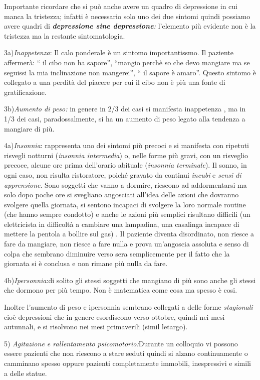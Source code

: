 \documentclass[]{article}
\begin{document}
Importante ricordare che si può anche avere un quadro di depressione in
cui manca la tristezza; infatti è necessario solo uno dei due sintomi
quindi possiamo avere quadri di \emph{\textbf{depressione sine
depressione}:} l'elemento più evidente non è la tristezza ma la restante
sintomatologia.

3a)\emph{Inappetenza}: Il calo ponderale è un sintomo importantissmo. Il
paziente affermerà: `` il cibo non ha sapore'', ``mangio perchè so che
devo mangiare ma se seguissi la mia inclinazione non mangerei'', `` il
sapore è amaro''. Questo sintomo è collegato a una perdità del piacere
per cui il cibo non è più una fonte di gratificazione.

3b)\emph{Aumento di peso:} in genere in 2/3 dei casi si manifesta
inappetenza , ma in 1/3 dei casi, paradossalmente, si ha un aumento di
peso legato alla tendenza a mangiare di più.

4a)\emph{Insonnia}: rappresenta uno dei sintomi più precoci e si
manifesta con ripetuti risvegli notturni (\emph{insonnia intermedia}) o,
nelle forme più gravi, con un risveglio precoce, alcune ore prima
dell'orario abituale (\emph{insonnia terminale}). Il sonno, in ogni
caso, non risulta ristoratore, poiché gravato da continui \emph{incubi}
e \emph{sensi di apprensione}. Sono soggetti che vanno a dormire,
riescono ad addormentarsi ma solo dopo poche ore si svegliano angosciati
all'idea delle azioni che dovranno svolgere quella giornata, si sentono
incapaci di svolgere la loro normale routine (che hanno sempre condotto)
e anche le azioni più semplici risultano difficili (un elettricista in
difficoltà a cambiare una lampadina, una casalinga incapace di mettere
la pentola a bollire sul gas) . Il paziente diventa disordinato, non
riesce a fare da mangiare, non riesce a fare nulla e prova un'angoscia
assoluta e senso di colpa che sembrano diminuire verso sera
semplicemente per il fatto che la giornata si è conclusa e non rimane
più nulla da fare.

4b)\emph{Ipersonnia}:di solito gli stessi soggetti che mangiano di più
sono anche gli stessi che dormono per più tempo. Non è matematica come
cosa ma spesso è cosi.

Inoltre l'aumento di peso e ipersonnia sembrano collegati a delle forme
\emph{stagionali} cioè depressioni che in genere esordiscono verso
ottobre, quindi nei mesi autunnali, e si risolvono nei mesi primaverili
(simil letargo).

5) \emph{Agitazione e rallentamento psicomotorio:}Durante un colloquio
vi possono essere pazienti che non riescono a stare seduti quindi si
alzano continuamente o camminano spesso oppure pazienti completamente
immobili, inespressivi e simili a delle statue.
\end{document}
